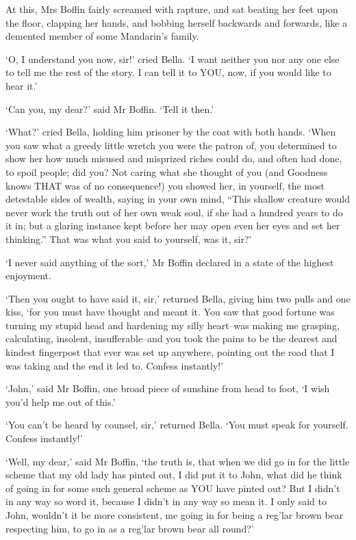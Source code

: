 At this, Mrs Boffin fairly screamed with rapture, and sat beating her
feet upon the floor, clapping her hands, and bobbing herself backwards
and forwards, like a demented member of some Mandarin’s family.

‘O, I understand you now, sir!’ cried Bella. ‘I want neither you nor any
one else to tell me the rest of the story. I can tell it to YOU, now, if
you would like to hear it.’

‘Can you, my dear?’ said Mr Boffin. ‘Tell it then.’

‘What?’ cried Bella, holding him prisoner by the coat with both hands.
‘When you saw what a greedy little wretch you were the patron of, you
determined to show her how much misused and misprized riches could
do, and often had done, to spoil people; did you? Not caring what she
thought of you (and Goodness knows THAT was of no consequence!) you
showed her, in yourself, the most detestable sides of wealth, saying in
your own mind, “This shallow creature would never work the truth out of
her own weak soul, if she had a hundred years to do it in; but a glaring
instance kept before her may open even her eyes and set her thinking.”
 That was what you said to yourself, was it, sir?’

‘I never said anything of the sort,’ Mr Boffin declared in a state of
the highest enjoyment.

‘Then you ought to have said it, sir,’ returned Bella, giving him two
pulls and one kiss, ‘for you must have thought and meant it. You saw
that good fortune was turning my stupid head and hardening my silly
heart--was making me grasping, calculating, insolent, insufferable--and
you took the pains to be the dearest and kindest fingerpost that ever
was set up anywhere, pointing out the road that I was taking and the end
it led to. Confess instantly!’

‘John,’ said Mr Boffin, one broad piece of sunshine from head to foot,
‘I wish you’d help me out of this.’

‘You can’t be heard by counsel, sir,’ returned Bella. ‘You must speak
for yourself. Confess instantly!’

‘Well, my dear,’ said Mr Boffin, ‘the truth is, that when we did go in
for the little scheme that my old lady has pinted out, I did put it to
John, what did he think of going in for some such general scheme as YOU
have pinted out? But I didn’t in any way so word it, because I didn’t in
any way so mean it. I only said to John, wouldn’t it be more consistent,
me going in for being a reg’lar brown bear respecting him, to go in as a
reg’lar brown bear all round?’

